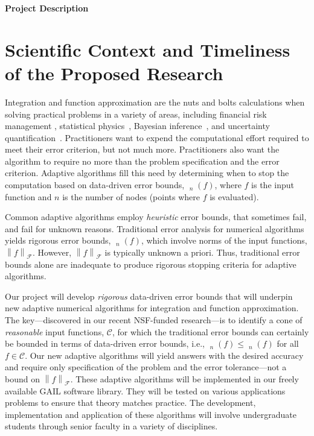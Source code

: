 \documentclass[11pt]{NSFamsart}
\DeclareMathOperator{\err}{err}
\DeclareMathOperator{\oerr}{\overline{\err}}
\DeclareMathOperator{\herr}{\widehat{\err}}
\newcommand{\cc}{\mathcal{C}}
\newcommand{\calf}{{\mathcal{F}}}
\newcommand{\norm}[2][{}]{\ensuremath{\left \lVert #2 \right \rVert}_{#1}}
\begin{document}

\centerline{\Large \textbf{Project Description}}
\vspace{-2ex}

\setcounter{tocdepth}{1}
\tableofcontents

\vspace{-6ex}

\section{Scientific Context and Timeliness of the Proposed Research}
Integration and function approximation are the nuts and bolts calculations when 
solving practical problems in a variety of areas, including financial risk management \cite{Gla03}, 
statistical physics~\cite{LanBin14}, 
Bayesian inference~\cite{GelEtal13}, and uncertainty quantification~\cite{ForEtal09, Smi14a}.  
Practitioners 
want to expend the  
computational effort required to meet their error criterion, but not much more. 
Practitioners also want the algorithm to require no more than the problem specification and the 
error criterion.   Adaptive algorithms fill this need by determining when to stop the computation 
based on data-driven error bounds, $\herr_n(f)$, where $f$ is the input function and $n$ is the 
number of nodes (points where $f$ is evaluated).

Common adaptive algorithms employ \emph{heuristic} error bounds, that sometimes fail, and fail for 
unknown reasons. Traditional error 
analysis for numerical algorithms 
yields rigorous error bounds, $\oerr_n(f)$, which involve norms of the input functions, 
$\norm[\calf]{f}$.  However, $\norm[\calf]{f}$ is typically unknown a 
priori.  Thus, traditional  error 
bounds alone are inadequate  to produce rigorous stopping criteria for adaptive algorithms.

Our project will develop \emph{rigorous} data-driven error bounds that will underpin new adaptive 
numerical algorithms for integration and function approximation.  The 
key---discovered in our recent NSF-funded research---is to identify a cone of \emph{reasonable} 
input functions, 
$\cc$,  for which the traditional error bounds can certainly be bounded in terms of 
data-driven error bounds, i.e., $\oerr_n(f) \le \herr_n(f)$ for all $f \in \cc$.  
Our new adaptive algorithms will yield answers with the desired accuracy and require only 
specification of the problem and the error tolerance---not a bound on $\norm[\calf]{f}$. 
These adaptive algorithms will be implemented in our freely available GAIL software library.  They will 
be tested on various applications problems to ensure that theory matches practice.  The 
development, implementation and application of these algorithms will involve undergraduate 
students through senior faculty in a variety of disciplines.
\end{document}
